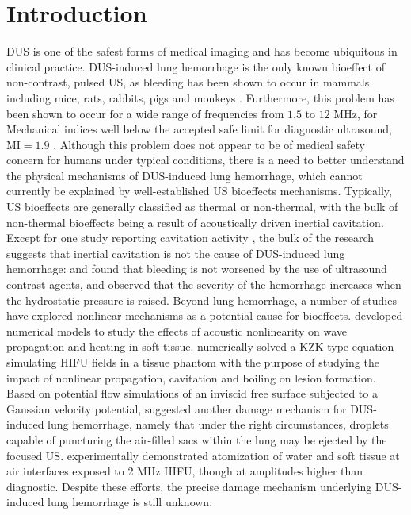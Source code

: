 \documentclass{jfm}%
\begin{document}
\begin{keywords}
\end{keywords}

\section{Introduction}%
\label{sec:introduction}%
% 
\ac{DUS} is one of the safest forms of medical imaging and has become
ubiquitous in clinical practice. \ac{DUS}-induced lung hemorrhage is
the only known bioeffect of non-contrast, pulsed \ac{US}, as bleeding
has been shown to occur in mammals including mice, rats, rabbits, pigs
and monkeys \citep{Child1990,OBrien2006a,Tarantal1994a,Miller2012}.
Furthermore, this problem has been shown to occur for a wide range of
frequencies from $1.5$ to $12$ MHz, for Mechanical indices well below
the accepted safe limit for diagnostic ultrasound, $\mbox{MI}=1.9$
\citep{OBrien2007}. Although this problem does not appear to be of
medical safety concern for humans under typical conditions, there is a
need to better understand the physical mechanisms of \ac{DUS}-induced
lung hemorrhage, which cannot currently be explained by
well-established \ac{US} bioeffects mechanisms. Typically, \ac{US}
bioeffects are generally classified as thermal or non-thermal, with
the bulk of non-thermal bioeffects being a result of acoustically
driven inertial cavitation. Except for one study reporting cavitation
activity \citep{Holland1996}, the bulk of the research suggests that
inertial cavitation is not the cause of \ac{DUS}-induced lung
hemorrhage: \cite{Raeman1996} and \cite{OBrien2004} found that
bleeding is not worsened by the use of ultrasound contrast agents, and
\cite{OBrien2000} observed that the severity of the hemorrhage
increases when the hydrostatic pressure is raised.  Beyond lung
hemorrhage, a number of studies have explored nonlinear mechanisms as
a potential cause for bioeffects. \cite{Filonenko2001} developed
numerical models to study the effects of acoustic nonlinearity on wave
propagation and heating in soft tissue. \cite{Khokhlova2006}
numerically solved a KZK-type equation simulating \ac{HIFU} fields in
a tissue phantom with the purpose of studying the impact of nonlinear
propagation, cavitation and boiling on lesion formation. Based on
potential flow simulations of an inviscid free surface subjected to a
Gaussian velocity potential, \cite{Tjan2007} suggested another damage
mechanism for \ac{DUS}-induced lung hemorrhage, namely that under the
right circumstances, droplets capable of puncturing the air-filled
sacs within the lung may be ejected by the focused
\ac{US}. \cite{Simon2012} experimentally demonstrated atomization of
water and soft tissue at air interfaces exposed to 2 MHz \ac{HIFU},
though at amplitudes higher than diagnostic. Despite these efforts,
the precise damage mechanism underlying \ac{DUS}-induced lung
hemorrhage is still unknown.
\end{document}
